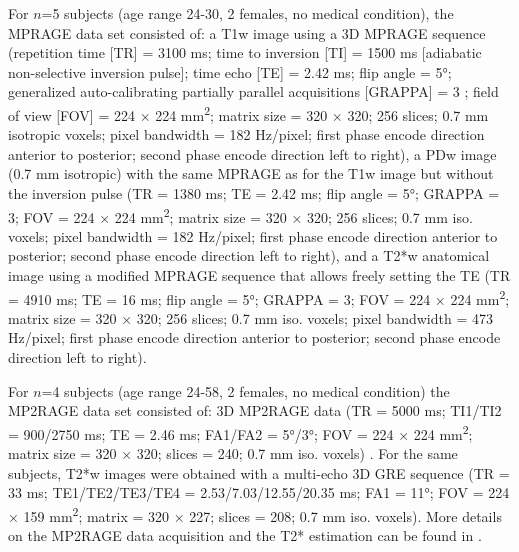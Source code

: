 For $n$=5 subjects (age range 24-30, 2 females, no medical condition), the MPRAGE data set consisted of: a T1w image using a 3D MPRAGE sequence (repetition time [TR] = 3100 ms; time to inversion [TI] = 1500 ms [adiabatic non-selective inversion pulse]; time echo [TE] = 2.42 ms; flip angle = 5°; generalized auto-calibrating partially parallel acquisitions [GRAPPA] = 3 \cite{Griswold2002}; field of view [FOV] = 224 × 224 mm\textsuperscript{2}; matrix size = 320 × 320; 256 slices; 0.7 mm isotropic voxels; pixel bandwidth = 182 Hz/pixel; first phase encode direction anterior to posterior; second phase encode direction left to right), a PDw image (0.7 mm isotropic) with the same MPRAGE as for the T1w image but without the inversion pulse (TR = 1380 ms; TE = 2.42 ms; flip angle = 5°; GRAPPA = 3; FOV = 224 × 224 mm\textsuperscript{2}; matrix size = 320 × 320; 256 slices; 0.7 mm iso. voxels; pixel bandwidth = 182 Hz/pixel; first phase encode direction anterior to posterior; second phase encode direction left to right), and a T2*w anatomical image using a modified MPRAGE sequence that allows freely setting the TE (TR = 4910 ms; TE = 16 ms; flip angle = 5°; GRAPPA = 3; FOV = 224 × 224 mm\textsuperscript{2}; matrix size = 320 × 320; 256 slices; 0.7 mm iso. voxels; pixel bandwidth = 473 Hz/pixel; first phase encode direction anterior to posterior; second phase encode direction left to right).

For $n$=4 subjects (age range 24-58, 2 females, no medical condition) the MP2RAGE data set consisted of: 3D MP2RAGE data (TR = 5000 ms; TI1/TI2 = 900/2750 ms; TE = 2.46 ms; FA1/FA2 = 5°/3°; FOV = 224 × 224 mm\textsuperscript{2}; matrix size = 320 × 320; slices = 240; 0.7 mm iso. voxels) \cite{Marques2010}. For the same subjects, T2*w images were obtained with a multi-echo 3D GRE sequence (TR = 33 ms; TE1/TE2/TE3/TE4 = 2.53/7.03/12.55/20.35 ms; FA1 = 11°; FOV = 224 × 159 mm\textsuperscript{2}; matrix = 320 × 227; slices = 208; 0.7 mm iso. voxels). More details on the MP2RAGE data acquisition and the T2* estimation can be found in \cite{Haast2016}.

